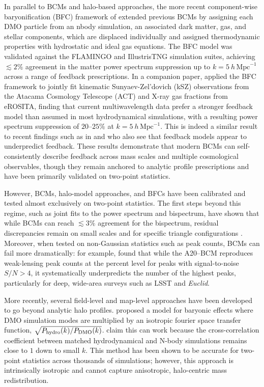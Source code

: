 \documentclass[linenumbers,trackchanges, twocolumn]{aastex701}
\begin{document}
In parallel to BCMs and halo-based approaches, the more recent component-wise baryonification (BFC) framework of \citet{Schneider2025a} extended previous BCMs by assigning each DMO particle from an nbody simulation, an associated dark matter, gas, and stellar components, which are displaced individually and assigned thermodynamic properties with hydrostatic and ideal gas equations. The BFC model was validated against the FLAMINGO and IllustrisTNG simulation suites, achieving $\lesssim 2\%$ agreement in the matter power spectrum suppression up to $k = 5~h\,\mathrm{Mpc}^{-1}$ across a range of feedback prescriptions. In a companion paper, \citet{Kovac2025} applied the BFC framework to jointly fit kinematic Sunyaev-Zel'dovich (kSZ) observations from the Atacama Cosmology Telescope (ACT) and X-ray gas fractions from eROSITA, finding that current multiwavelength data prefer a stronger feedback model than assumed in most hydrodynamical simulations, with a resulting power spectrum suppression of $20$--$25\%$ at $k = 5~h\,\mathrm{Mpc}^{-1}$. This is indeed a similar result to recent findings such as in \cite{hadizikya} and \cite{bigwood} who also see that feedback models appear to underpredict feedback. These results demonstrate that modern BCMs can self-consistently describe feedback across mass scales and multiple cosmological observables, though they remain anchored to analytic profile prescriptions and have been primarily validated on two-point statistics.

However, BCMs, halo-model approaches, and BFCs have been calibrated and tested almost exclusively on two-point statistics. The first steps beyond this regime, such as joint fits to the power spectrum and bispectrum, have shown that while BCMs can reach $\lesssim 3\%$ agreement for the bispectrum, residual discrepancies remain on small scales and for specific triangle configurations \citep{Arico2021a}. Moreover, when tested on non-Gaussian statistics such as peak counts, BCMs can fail more dramatically: for example, \citet{Lee2023} found that while the A20--BCM reproduces weak-lensing peak counts at the percent level for peaks with signal-to-noise $S/N> 4$, it systematically underpredicts the number of the highest peaks, particularly for deep, wide-area surveys such as LSST and \textit{Euclid}. 

More recently, several field-level and map-level approaches have been developed to go beyond analytic halo profiles. \citet{Sharma2024} proposed a model for baryonic effects where DMO simulation modes are multiplied by an isotropic fourier space transfer function, $\sqrt{P_{\rm hydro}(k)/P_{\rm DMO}(k)}$. \cite{} claim this can work because the cross-correlation coefficient between matched hydrodynamical and N-body simulations remains close to $1$ down to small $k$. This method has been shown to be accurate for two-point statistics across thousands of simulations; however, this approach is intrinsically isotropic and cannot capture anisotropic, halo-centric mass redistribution.
\end{document}
